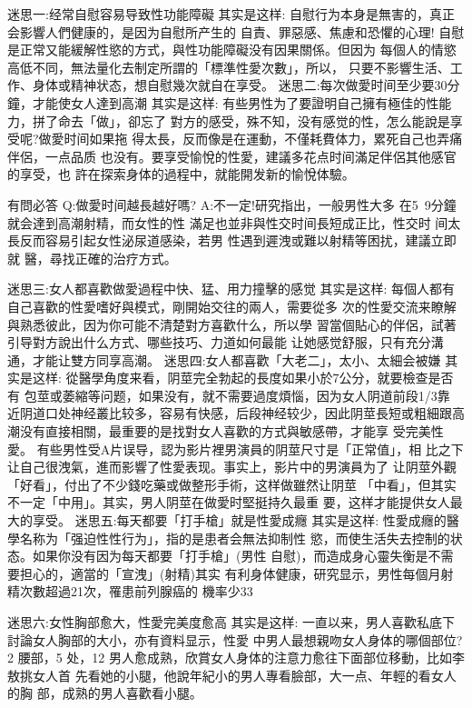 \documentclass[12pt,UTF8]{ctexbook}
\begin{document}
迷思一:经常自慰容易导致性功能障礙
其实是这样:
自慰行为本身是無害的，真正会影響人們健康的，是因为自慰所产生的
自責、罪惡感、焦慮和恐懼的心理!
自慰是正常又能緩解性慾的方式，與性功能障礙没有因果關係。但因为
每個人的情慾高低不同，無法量化去制定所謂的「標準性愛次數」，所以，
只要不影響生活、工作、身体或精神状态，想自慰幾次就自在享受。
迷思二:每次做愛时间至少要30分鐘，才能使女人達到高潮
其实是这样:
有些男性为了要證明自己擁有極佳的性能力，拼了命去「做」，卻忘了
對方的感受，殊不知，没有感觉的性，怎么能說是享受呢?做愛时间如果拖
得太長，反而像是在運動，不僅耗費体力，累死自己也弄痛伴侶，一点品质
也没有。要享受愉悅的性愛，建議多花点时间滿足伴侶其他感官的享受，也
許在探索身体的過程中，就能開发新的愉悅体驗。

有問必答
Q:做愛时间越長越好嗎?
A:不一定!研究指出，一般男性大多
在5~9分鐘就会達到高潮射精，而女性的性
滿足也並非與性交时间長短成正比，性交时
间太長反而容易引起女性泌尿道感染，若男
性遇到遲洩或難以射精等困扰，建議立即就
醫，尋找正確的治疗方式。

迷思三:女人都喜歡做愛過程中快、猛、用力撞擊的感觉
其实是这样:
每個人都有自己喜歡的性愛嗜好與模式，剛開始交往的兩人，需要從多
次的性愛交流来瞭解與熟悉彼此，因为你可能不清楚對方喜歡什么，所以學
習當個貼心的伴侶，試著引导對方說出什么方式、哪些技巧、力道如何最能
让她感觉舒服，只有充分溝通，才能让雙方同享高潮。
迷思四:女人都喜歡「大老二」，太小、太細会被嫌
其实是这样:
從醫學角度来看，阴莖完全勃起的長度如果小於7公分，就要檢查是否有
包莖或萎縮等问题，如果没有，就不需要過度煩惱，因为女人阴道前段1/3靠
近阴道口处神经叢比较多，容易有快感，后段神经较少，因此阴莖長短或粗細跟高潮没有直接相關，最重要的是找對女人喜歡的方式與敏感帶，才能享
受完美性愛。
有些男性受A片误导，認为影片裡男演員的阴莖尺寸是「正常值」，相
比之下让自己很洩氣，進而影響了性愛表现。事实上，影片中的男演員为了
让阴莖外觀「好看」，付出了不少錢吃藥或做整形手術，这样做雖然让阴莖
「中看」，但其实不一定「中用」。其实，男人阴莖在做愛时堅挺持久最重
要，这样才能提供女人最大的享受。
迷思五:每天都要「打手槍」就是性愛成癮
其实是这样:
性愛成癮的醫學名称为「强迫性性行为」，指的是患者会無法抑制性
慾，而使生活失去控制的状态。如果你没有因为每天都要「打手槍」(男性
自慰)，而造成身心靈失衡是不需要担心的，適當的「宣洩」(射精)其实
有利身体健康，研究显示，男性每個月射精次數超過21次，罹患前列腺癌的
機率少33%

迷思六:女性胸部愈大，性愛完美度愈高
其实是这样:
一直以来，男人喜歡私底下討論女人胸部的大小，亦有資料显示，性愛
中男人最想親吻女人身体的哪個部位?2%
腰部，5%
处，12%
男人愈成熟，欣賞女人身体的注意力愈往下面部位移動，比如李敖挑女人首
先看她的小腿，他說年紀小的男人專看臉部，大一点、年輕的看女人的胸
部，成熟的男人喜歡看小腿。
\end{document}
